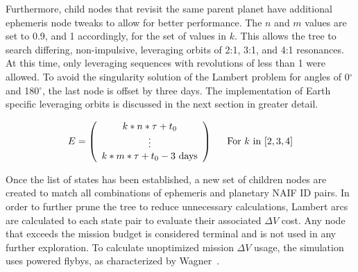 \documentclass[letterpaper, preprint, paper,11pt]{AAS}	%
\begin{document}
Furthermore, child nodes that revisit the same parent planet have additional ephemeris node tweaks to allow for better performance. The $n$ and $m$ values are set to 0.9, and 1 accordingly, for the set of values in $k$. This allows the tree to search differing, non-impulsive, leveraging orbits of 2:1, 3:1, and 4:1 resonances. At this time, only leveraging sequences with revolutions of less than 1 were allowed. To avoid the singularity solution of the Lambert problem for angles of 0$^\circ$ and 180$^\circ$, the last node is offset by three days. The implementation of Earth specific leveraging orbits is discussed in the next section in greater detail.

\begin{equation*}
    \label{eq:ephemArrayLev}
    E =
    \left(\begin{array}{c}
        k*n*\tau + t_0 \\
        \vdots \\
        k*m*\tau + t_0 - 3 \text{ days} \\
    \end{array}\right)\hspace{1.5em}
    \text{For } k \text{ in } [2, 3, 4]
\end{equation*}

Once the list of states has been established, a new set of children nodes are created to match all combinations of ephemeris and planetary NAIF ID pairs. In order to further prune the tree to reduce unnecessary calculations, Lambert arcs are calculated to each state pair to evaluate their associated $\Delta V$ cost. Any node that exceeds the mission budget is considered terminal and is not used in any further exploration. To calculate unoptimized mission $\Delta V$ usage, the simulation uses powered flybys, as characterized by Wagner~\cite{Wagner2015}.
\end{document}
